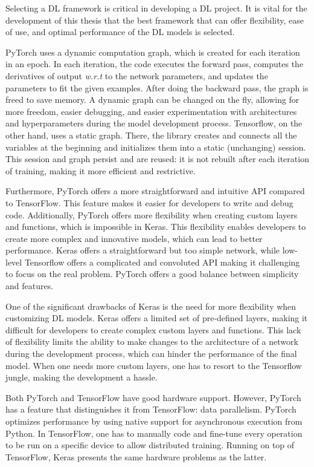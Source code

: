 Selecting a \ac{DL} framework is critical in developing a \ac{DL} project. It is vital for the development of this thesis that the best framework that can offer flexibility, ease of use, and optimal performance of the \ac{DL} models is selected.

PyTorch uses a dynamic computation graph, which is created for each iteration in an epoch. In each iteration, the code executes the forward pass, computes the derivatives of output \textit{w.r.t} to the network parameters, and updates the parameters to fit the given examples. After doing the backward pass, the graph is freed to save memory. A dynamic graph can be changed on the fly, allowing for more freedom, easier debugging, and easier experimentation with architectures and hyperparameters during the model development process. Tensorflow, on the other hand, uses a static graph. There, the library creates and connects all the variables at the beginning and initializes them into a static (unchanging) session. This session and graph persist and are reused: it is not rebuilt after each iteration of training, making it more efficient and restrictive.

Furthermore, PyTorch offers a more straightforward and intuitive \ac{API} compared to TensorFlow. This feature makes it easier for developers to write and debug code. Additionally, PyTorch offers more flexibility when creating custom layers and functions, which is impossible in Keras. This flexibility enables developers to create more complex and innovative models, which can lead to better performance. Keras offers a straightforward but too simple network, while low-level Tensorflow offers a complicated and convoluted \ac{API} making it challenging to focus on the real problem. PyTorch offers a good balance between simplicity and features.

One of the significant drawbacks of Keras is the need for more flexibility when customizing \ac{DL} models. Keras offers a limited set of pre-defined layers, making it difficult for developers to create complex custom layers and functions. This lack of flexibility limits the ability to make changes to the architecture of a network during the development process, which can hinder the performance of the final model. When one needs more custom layers, one has to resort to the Tensorflow jungle, making the development a hassle.

Both PyTorch and TensorFlow have good hardware support. However, PyTorch has a feature that distinguishes it from TensorFlow: data parallelism. PyTorch optimizes performance by using native support for asynchronous execution from Python. In TensorFlow, one has to manually code and fine-tune every operation to be run on a specific device to allow distributed training. Running on top of TensorFlow, Keras presents the same hardware problems as the latter.

